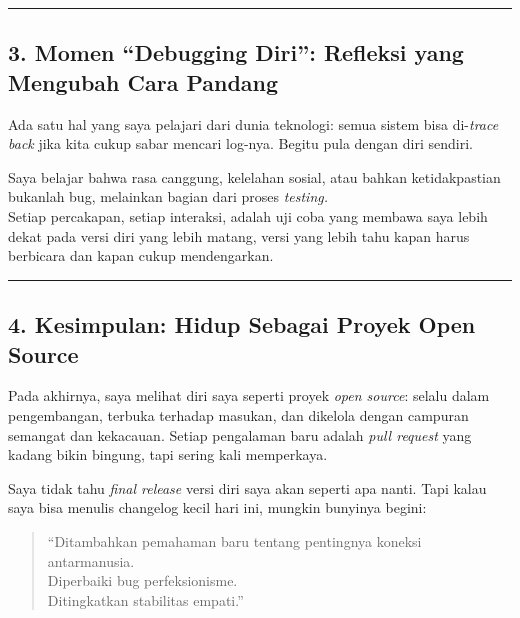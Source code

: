 \documentclass[
  letterpaper,
  DIV=11,
  numbers=noendperiod]{scrreprt}
\begin{document}
\begin{center}\rule{0.5\linewidth}{0.5pt}\end{center}

\subsection{\texorpdfstring{\textbf{3. Momen ``Debugging Diri'':
Refleksi yang Mengubah Cara
Pandang}}{3. Momen ``Debugging Diri'': Refleksi yang Mengubah Cara Pandang}}\label{momen-debugging-diri-refleksi-yang-mengubah-cara-pandang}

Ada satu hal yang saya pelajari dari dunia teknologi: semua sistem bisa
di-\emph{trace back} jika kita cukup sabar mencari log-nya. Begitu pula
dengan diri sendiri.

Saya belajar bahwa rasa canggung, kelelahan sosial, atau bahkan
ketidakpastian bukanlah bug, melainkan bagian dari proses
\emph{testing.}\\
Setiap percakapan, setiap interaksi, adalah uji coba yang membawa saya
lebih dekat pada versi diri yang lebih matang, versi yang lebih tahu
kapan harus berbicara dan kapan cukup mendengarkan.

\begin{center}\rule{0.5\linewidth}{0.5pt}\end{center}

\subsection{\texorpdfstring{\textbf{4. Kesimpulan: Hidup Sebagai Proyek
Open
Source}}{4. Kesimpulan: Hidup Sebagai Proyek Open Source}}\label{kesimpulan-hidup-sebagai-proyek-open-source}

Pada akhirnya, saya melihat diri saya seperti proyek \emph{open source}:
selalu dalam pengembangan, terbuka terhadap masukan, dan dikelola dengan
campuran semangat dan kekacauan. Setiap pengalaman baru adalah
\emph{pull request} yang kadang bikin bingung, tapi sering kali
memperkaya.

Saya tidak tahu \emph{final release} versi diri saya akan seperti apa
nanti. Tapi kalau saya bisa menulis changelog kecil hari ini, mungkin
bunyinya begini:

\begin{quote}
``Ditambahkan pemahaman baru tentang pentingnya koneksi antarmanusia.\\
Diperbaiki bug perfeksionisme.\\
Ditingkatkan stabilitas empati.''
\end{quote}
\end{document}
